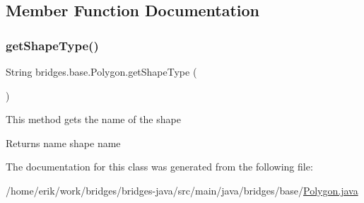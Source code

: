\subsection{Member Function Documentation}
\mbox{\label{classbridges_1_1base_1_1_polygon_a1d9ab114712eacf9c08edc0377e8330c}} 
\subsubsection{\texorpdfstring{get\+Shape\+Type()}{getShapeType()}}
{\footnotesize\ttfamily String bridges.\+base.\+Polygon.\+get\+Shape\+Type (\begin{DoxyParamCaption}{ }\end{DoxyParamCaption})}

This method gets the name of the shape

\begin{DoxyReturn}{Returns}
name shape name 
\end{DoxyReturn}


The documentation for this class was generated from the following file\+:\begin{DoxyCompactItemize}
\item 
/home/erik/work/bridges/bridges-\/java/src/main/java/bridges/base/\hyperlink{_polygon_8java}{Polygon.\+java}\end{DoxyCompactItemize}
